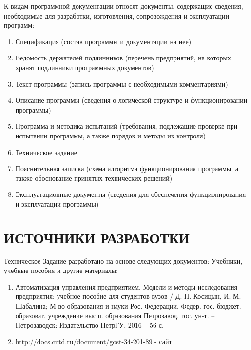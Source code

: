\documentclass[russian, utf8, 12pt,pointsubsection,floatsubsection]{eskdtext}
\begin{document}
К видам программной документации относят документы, содержащие сведения, необходимые для разработки, изготовления, сопровождения и эксплуатации программ:
\begin{enumerate}
    \item Спецификация (состав программы и документации на нее)
\item Ведомость	держателей	подлинников	(перечень	предприятий,	на которых хранят подлинники программных документов)
\item Текст программы (запись программы с необходимыми комментариями)
\item Описание	программы	(сведения	о	логической	структуре	и функционировании программы)
\item Программа и методика испытаний (требования, подлежащие проверке при испытании программы, а также порядок и методы их контроля)
\item Техническое задание
\item Пояснительная	записка	(схема	алгоритма	функционирования программы, а также обоснование принятых технических решений)
\item Эксплуатационные	документы	(сведения	для	обеспечения функционирования и эксплуатации программы)

\end{enumerate}


\section{ИСТОЧНИКИ РАЗРАБОТКИ}
Техническое Задание разработано на основе следующих документов: Учебники, учебные пособия и другие материалы:
\begin{enumerate}
    \item Автоматизация управления предприятием. Модели и методы исследования предприятия: учебное пособие для студентов вузов / Д. П. Косицын, И. М. Шабалина; М-во образования и науки Рос. Федерации, Федер. гос. бюджет. образоват. учреждение высш. образования Петрозавод. гос. ун-т. – Петрозаводск: Издательство ПетрГУ, 2016 – 56 с.
\item http://docs.cntd.ru/document/gost-34-201-89 - сайт
\end{enumerate}
\end{document}
